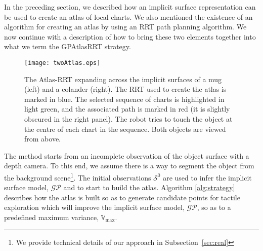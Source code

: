 In the preceding section, we described how an implicit surface representation can be used to create an atlas of local charts. We also mentioned the existence of an algorithm for creating an atlas by using an RRT path planning algorithm. We now continue with a description of how to bring these two elements together into what we term the GPAtlasRRT strategy. 

\begin{figure*}[t]
    \centering
    \texttt{[image: twoAtlas.eps]}
    \caption{The Atlas-RRT expanding across the implicit surfaces of a mug (left) and a colander (right). The RRT used to create the atlas is marked in blue. The selected sequence of charts is highlighted in light green, and the associated path is marked in red (it is slightly obscured in the right panel). The robot tries to touch the object at the centre of each chart in the sequence. Both objects are viewed from above.}
    \label{fig:GPAtlasRRTtwo}
\end{figure*}

The method starts from an incomplete observation of the object surface with a depth camera. To this end, we assume there is a way to segment the object from the background scene\footnote{We provide technical details of our approach in Subsection~\ref{sec:real}}. 
The initial observations $\mathcal{S}^0$ are used to infer the implicit surface model, $\mathcal{GP}$ and to start to build the atlas. Algorithm \ref{alg:strategy} describes how the atlas is built so as to generate candidate points for tactile exploration which will improve the implicit surface model, $\mathcal{GP}$, so as to a predefined maximum variance, $\mathbb{V}_{\max}$. 

